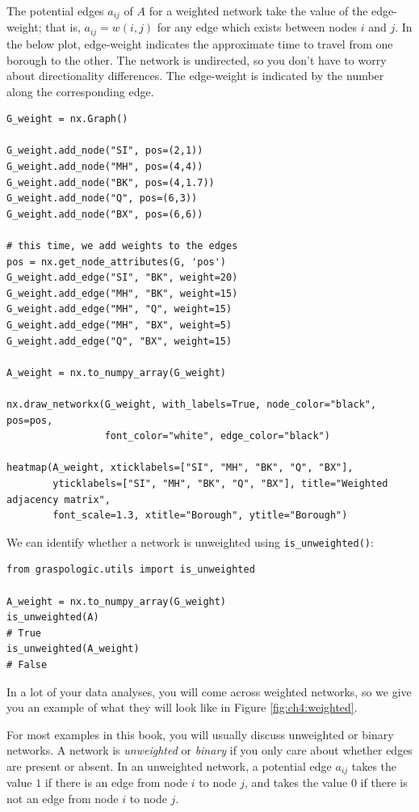 The potential edges $a_{ij}$ of $A$ for a weighted network take the value of the edge-weight; that is, $a_{ij} = w(i, j)$ for any edge which exists between nodes $i$ and $j$. In the below plot, edge-weight indicates the approximate time to travel from one borough to the other. The network is undirected, so you don't have to worry about directionality differences. The edge-weight is indicated by the number along the corresponding edge.

\begin{lstlisting}[style=python]
G_weight = nx.Graph()

G_weight.add_node("SI", pos=(2,1))
G_weight.add_node("MH", pos=(4,4))
G_weight.add_node("BK", pos=(4,1.7))
G_weight.add_node("Q", pos=(6,3))
G_weight.add_node("BX", pos=(6,6))

# this time, we add weights to the edges
pos = nx.get_node_attributes(G, 'pos')
G_weight.add_edge("SI", "BK", weight=20)
G_weight.add_edge("MH", "BK", weight=15)
G_weight.add_edge("MH", "Q", weight=15)
G_weight.add_edge("MH", "BX", weight=5)
G_weight.add_edge("Q", "BX", weight=15)

A_weight = nx.to_numpy_array(G_weight)

nx.draw_networkx(G_weight, with_labels=True, node_color="black", pos=pos,
                 font_color="white", edge_color="black")

heatmap(A_weight, xticklabels=["SI", "MH", "BK", "Q", "BX"],
        yticklabels=["SI", "MH", "BK", "Q", "BX"], title="Weighted adjacency matrix", 
        font_scale=1.3, xtitle="Borough", ytitle="Borough")
\end{lstlisting}
We can identify whether a network is unweighted using \texttt{is\_unweighted()}:


\begin{lstlisting}[style=python]
from graspologic.utils import is_unweighted

A_weight = nx.to_numpy_array(G_weight)
is_unweighted(A)
# True
is_unweighted(A_weight)
# False
\end{lstlisting}
In a lot of your data analyses, you will come across weighted networks, so we give you an example of what they will look like in Figure \ref{fig:ch4:weighted}.

For most examples in this book, you will usually discuss {unweighted} or {binary} networks. A network is \textit{unweighted} or \textit{binary} if you only care about whether edges are {present} or {absent}. In an unweighted network, a potential edge $a_{ij}$ takes the value $1$ if there is an edge from node $i$ to node $j$, and takes the value $0$ if there is {not} an edge from node $i$ to node $j$.

